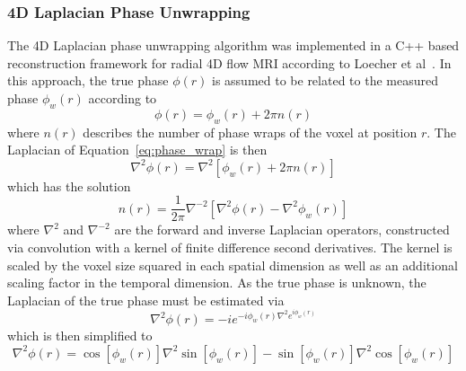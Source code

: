 \subsubsection{4D Laplacian Phase Unwrapping}
The 4D Laplacian phase unwrapping algorithm was implemented in a C++ based reconstruction framework for radial 4D flow MRI according to Loecher et al~\cite{loecherPhaseUnwrapping4D2016}. In this approach, the true phase $\phi(r)$ is assumed to be related to the measured phase $\phi_w(r)$ according to
\begin{equation}
     \phi(r) = \phi_w(r) + 2\pi n(r)
     \label{eq:phase_wrap}
\end{equation}
where $n(r)$ describes the number of phase wraps of the voxel at position $r$. The Laplacian of Equation~\ref{eq:phase_wrap} is then
\begin{equation}
    \nabla^2 \phi(r) = \nabla^2 \left[\phi_w(r) + 2\pi n(r) \right]
    \label{eq:laplacian}
\end{equation}
which has the solution
\begin{equation}
    n(r)=\frac{1}{2\pi}\nabla^{-2} \left[\nabla^2 \phi(r)-\nabla^2 \phi_w(r)\right]
    \label{eq:laplacian_solution}
\end{equation}
where $\nabla^{2}$ and $\nabla^{-2}$ are the forward and inverse Laplacian operators, constructed via convolution with a kernel of finite difference second derivatives. The kernel is scaled by the voxel size squared in each spatial dimension as well as an additional scaling factor in the temporal dimension. As the true phase is unknown, the Laplacian of the true phase must be estimated via
\begin{equation}
    \nabla^2\phi(r)=-ie^{-i\phi_w(r)\nabla^2 e^{i\phi_w(r)}}
    \label{eq:true_phase}
\end{equation}
which is then simplified to
\begin{equation}
    \nabla^2\phi(r)=\cos\left[\phi_w(r)\right]\nabla^2\sin\left[\phi_w(r)\right]-\sin\left[\phi_w(r)\right]\nabla^2\cos\left[\phi_w(r)\right]
    \label{eq:simplified}
\end{equation}

